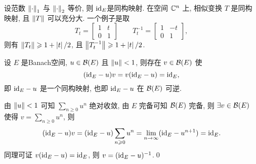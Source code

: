     \begin{Remark}
        设范数 $ \left\| \cdot \right\|_{1} $ 与 $ \left\| \cdot \right\|_{2} $ 等价, 则 $ \mathrm{id}_{E} $是同构映射. 在空间 $ \mathbb{C}^{n} $ 上, 相似变换 $ T $ 是同构映射, 且 $ \left\| T \right\| $ 可以充分大. 一个例子是取
        \[
            T_{t}=\begin{bmatrix}
                1 & t\\
                0 & 1
            \end{bmatrix}
            \qquad
            T_{t}^{-1}=\begin{bmatrix}
                1 & -t \\
                0 & 1
            \end{bmatrix},
        \]
        则有 $ \left\| T_{t} \right\|\geqslant1+\left| t \right| /2 $, 且 $ \left\| T_{t}^{-1} \right\|\geqslant 1+\left| t \right| /2 $.  
    \end{Remark}

    \begin{Theorem}
         设 $ E $ 是Banach空间,  $ u\in\mathcal{B}(E) $ 且 $ \left\| u \right\|<1 $, 则存在 $ v\in\mathcal{B}(E) $ 使
         \[
             (\mathrm{id}_{E}-u)v=v(\mathrm{id}_{E}-u)=\mathrm{id}_{E},
         \]
         即 $ \mathrm{id}_{E}-u $ 是一个同构映射, 也即 $ \mathrm{id}_{E}-u $ 在 $ \mathcal{B}(E) $ 可逆.
    \end{Theorem}
    \begin{Proof}
        由 $ \left\| u \right\|<1 $ 可知 $ \sum\limits_{n\geqslant0}u^n $ 绝对收敛, 由 $ E $ 完备可知 $ \mathcal{B}
        (E) $ 完备, 则 $ \exists v\in\mathcal{B}(E) $ 使得 $ v=\sum\limits_{n\geqslant 0}u^n $, 则
        \[
            (\mathrm{id}_E-u)v=(\mathrm{id}_E-u)\sum_{n\geqslant 0}u^n=\lim_{n\to\infty}(\mathrm{id}_E-u^{n+1})=\mathrm{id}_E.
        \]
        同理可证 $ v(\mathrm{id}_E-u)=\mathrm{id}_E $, 则 $ v=(\mathrm{id}_E-u)^{-1} $.\qed
    \end{Proof}
    
